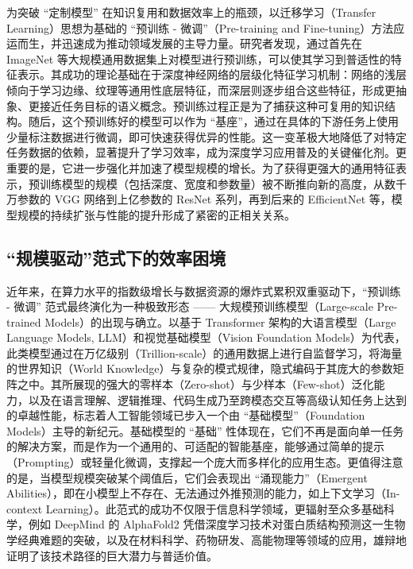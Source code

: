 \documentclass[../main.tex]{subfiles}
\begin{document}
为突破 “定制模型” 在知识复用和数据效率上的瓶颈，以迁移学习（Transfer Learning）思想为基础的 “预训练 - 微调”（Pre-training and Fine-tuning）方法应运而生，并迅速成为推动领域发展的主导力量。研究者发现，通过首先在 ImageNet 等大规模通用数据集上对模型进行预训练，可以使其学习到普适性的特征表示。其成功的理论基础在于深度神经网络的层级化特征学习机制：网络的浅层倾向于学习边缘、纹理等通用性底层特征，而深层则逐步组合这些特征，形成更抽象、更接近任务目标的语义概念。预训练过程正是为了捕获这种可复用的知识结构。随后，这个预训练好的模型可以作为 “基座”，通过在具体的下游任务上使用少量标注数据进行微调，即可快速获得优异的性能。这一变革极大地降低了对特定任务数据的依赖，显著提升了学习效率，成为深度学习应用普及的关键催化剂。更重要的是，它进一步强化并加速了模型规模的增长。为了获得更强大的通用特征表示，预训练模型的规模（包括深度、宽度和参数量）被不断推向新的高度，从数千万参数的 VGG 网络到上亿参数的 ResNet 系列，再到后来的 EfficientNet 等，模型规模的持续扩张与性能的提升形成了紧密的正相关关系。


\subsection[\hspace{-2pt}“规模驱动”范式下的效率困境]{{\heiti{} \hspace{-8pt}“规模驱动”范式下的效率困境}}\label{sec:1.2:model-scale-growth}

近年来，在算力水平的指数级增长与数据资源的爆炸式累积双重驱动下，“预训练 - 微调” 范式最终演化为一种极致形态 —— 大规模预训练模型（Large-scale Pre-trained Models）的出现与确立。以基于 Transformer 架构的大语言模型（Large Language Models, LLM）和视觉基础模型（Vision Foundation Models）为代表，此类模型通过在万亿级别（Trillion-scale）的通用数据上进行自监督学习，将海量的世界知识（World Knowledge）与复杂的模式规律，隐式编码于其庞大的参数矩阵之中。其所展现的强大的零样本（Zero-shot）与少样本（Few-shot）泛化能力，以及在语言理解、逻辑推理、代码生成乃至跨模态交互等高级认知任务上达到的卓越性能，标志着人工智能领域已步入一个由 “基础模型”（Foundation Models）主导的新纪元。基础模型的 “基础” 性体现在，它们不再是面向单一任务的解决方案，而是作为一个通用的、可适配的智能基座，能够通过简单的提示（Prompting）或轻量化微调，支撑起一个庞大而多样化的应用生态。更值得注意的是，当模型规模突破某个阈值后，它们会表现出 “涌现能力”（Emergent Abilities），即在小模型上不存在、无法通过外推预测的能力，如上下文学习（In-context Learning）。此范式的成功不仅限于信息科学领域，更辐射至众多基础科学，例如 DeepMind 的 AlphaFold2 凭借深度学习技术对蛋白质结构预测这一生物学经典难题的突破，以及在材料科学、药物研发、高能物理等领域的应用，雄辩地证明了该技术路径的巨大潜力与普适价值。
\end{document}
